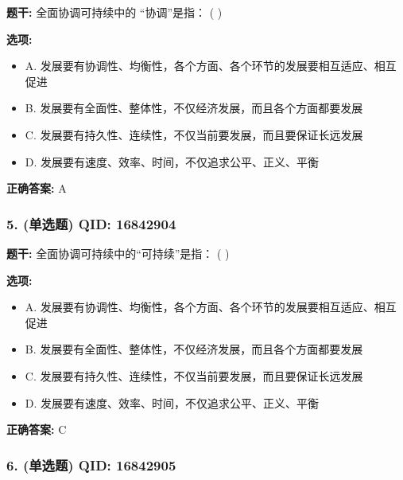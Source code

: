 \documentclass[12pt,UTF8]{ctexart}
\begin{document}
\textbf{题干:}
全面协调可持续中的 “协调”是指： ( )

\textbf{选项:}
\begin{itemize}[leftmargin=*]

  \item A. 发展要有协调性、均衡性，各个方面、各个环节的发展要相互适应、相互促进

  \item B. 发展要有全面性、整体性，不仅经济发展，而且各个方面都要发展

  \item C. 发展要有持久性、连续性，不仅当前要发展，而且要保证长远发展

  \item D. 发展要有速度、效率、时间，不仅追求公平、正义、平衡

\end{itemize}

\textbf{正确答案:}
A

\vspace{0.3em}\hrulefill\vspace{0.7em}

\subsubsection*{5. (单选题) \small QID: 16842904}

\textbf{题干:}
全面协调可持续中的“可持续”是指： ( )

\textbf{选项:}
\begin{itemize}[leftmargin=*]

  \item A. 发展要有协调性、均衡性，各个方面、各个环节的发展要相互适应、相互促进

  \item B. 发展要有全面性、整体性，不仅经济发展，而且各个方面都要发展

  \item C. 发展要有持久性、连续性，不仅当前要发展，而且要保证长远发展

  \item D. 发展要有速度、效率、时间，不仅追求公平、正义、平衡

\end{itemize}

\textbf{正确答案:}
C

\vspace{0.3em}\hrulefill\vspace{0.7em}

\subsubsection*{6. (单选题) \small QID: 16842905}
\end{document}
